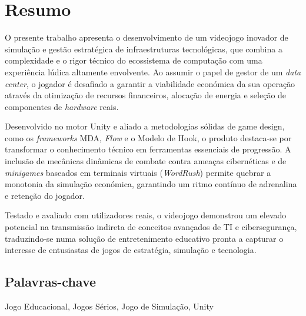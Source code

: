 \chapter{Resumo}
\label{chap:resumo}

O presente trabalho apresenta o desenvolvimento de um videojogo inovador de simulação e 
gestão estratégica de infraestruturas tecnológicas, que combina a complexidade e o rigor 
técnico do ecossistema de computação com uma experiência lúdica altamente envolvente. 
Ao assumir o papel de gestor de um \textit{data center}, o jogador é desafiado a garantir 
a viabilidade económica da sua operação através da otimização de recursos financeiros, 
alocação de energia e seleção de componentes de \textit{hardware} reais.


Desenvolvido no motor Unity e aliado a metodologias sólidas de game design, 
como os \textit{frameworks} \ac{MDA}, \textit{Flow} e o Modelo de Hook, o produto 
destaca-se por transformar o conhecimento técnico em ferramentas essenciais de progressão. 
A inclusão de mecânicas dinâmicas de combate contra ameaças cibernéticas e de 
\textit{minigames} baseados em terminais virtuais (\textit{WordRush}) permite 
quebrar a monotonia da simulação económica, garantindo um ritmo contínuo de adrenalina e retenção do jogador.

Testado e avaliado com utilizadores reais, o videojogo demonstrou um elevado 
potencial na transmissão indireta de conceitos avançados de \ac{TI} e cibersegurança, 
traduzindo-se numa solução de entretenimento educativo pronta a capturar o interesse de 
entusiastas de jogos de estratégia, simulação e tecnologia.

\section*{Palavras-chave}
Jogo Educacional, Jogos Sérios, Jogo de Simulação, Unity
